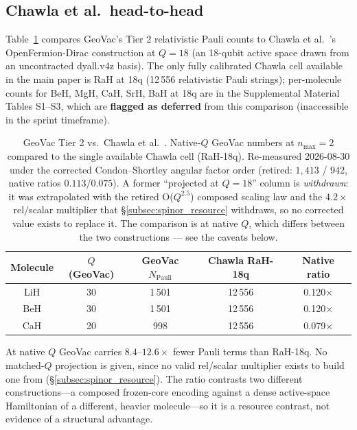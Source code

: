 \documentclass[aps,pra,twocolumn,superscriptaddress,longbibliography]{revtex4-2}
\begin{document}
\subsection{Chawla et al.\ head-to-head}
\label{subsec:sunaga}

Table~\ref{tab:sunaga} compares GeoVac's Tier 2 relativistic Pauli
counts to Chawla et al.~\cite{Chawla2024}'s
OpenFermion-Dirac construction at $Q = 18$ (an 18-qubit active space
drawn from an uncontracted dyall.v4z basis). The only fully
calibrated Chawla cell available in the main paper is RaH at 18q
(12\,556 relativistic Pauli strings); per-molecule counts for BeH,
MgH, CaH, SrH, BaH at 18q are in the Supplemental Material Tables
S1--S3, which are \textbf{flagged as deferred} from this comparison
(inaccessible in the sprint timeframe).

\begin{table}[h]
\caption{GeoVac Tier 2 vs.\ Chawla et al.~\cite{Chawla2024}. Native-$Q$
GeoVac numbers at $n_{\max}=2$ compared to the single available
Chawla cell (RaH-18q).  Re-measured 2026-08-30 under
the corrected Condon--Shortley angular factor order (retired: $1{,}413$ /
$942$, native ratios $0.113$/$0.075$).  A former ``projected at $Q=18$''
column is \emph{withdrawn}: it was extrapolated with the retired
O($Q^{2.5}$) composed scaling law and the $4.2\times$ rel/scalar
multiplier that \S\ref{subsec:spinor_resource} withdraws, so no corrected
value exists to replace it.  The comparison is at native $Q$, which
differs between the two constructions --- see the caveats below.}
\label{tab:sunaga}
\begin{ruledtabular}
\begin{tabular}{ccccc}
Molecule & $Q$ (GeoVac) & GeoVac $N_{\mathrm{Pauli}}$ & Chawla RaH-18q & Native ratio \\
\hline
LiH & 30 & 1\,501 & 12\,556 & 0.120$\times$ \\
BeH & 30 & 1\,501 & 12\,556 & 0.120$\times$ \\
CaH & 20 & 998 & 12\,556 & 0.079$\times$ \\
\end{tabular}
\end{ruledtabular}
\end{table}

At native $Q$ GeoVac carries $8.4$--$12.6\times$ fewer Pauli terms than
RaH-18q.  No matched-$Q$ projection is given, since no valid
rel/scalar multiplier exists to build one from
(\S\ref{subsec:spinor_resource}).  The ratio contrasts two different
constructions---a composed frozen-core encoding against a dense
active-space Hamiltonian of a different, heavier molecule---so it is a
resource contrast, not evidence of a structural advantage.
\end{document}
